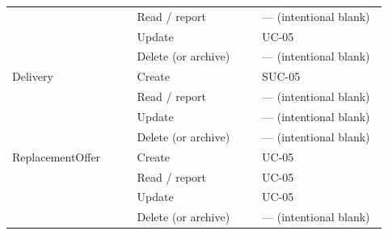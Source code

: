 \begin{longtable}{>{\raggedright\arraybackslash}p{0.3067\linewidth}>{\raggedright\arraybackslash}p{0.3067\linewidth}>{\raggedright\arraybackslash}p{0.3067\linewidth}}
 & Read / report & --- (intentional blank) \\
 & Update & UC-05 \\
 & Delete (or archive) & --- (intentional blank) \\
Delivery & Create & SUC-05 \\
 & Read / report & --- (intentional blank) \\
 & Update & --- (intentional blank) \\
 & Delete (or archive) & --- (intentional blank) \\
ReplacementOffer & Create & UC-05 \\
 & Read / report & UC-05 \\
 & Update & UC-05 \\
 & Delete (or archive) & --- (intentional blank) \\
\end{longtable}
